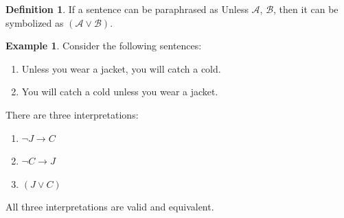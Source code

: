 \documentclass{tufte-handout}
\theoremstyle{definition}
\newtheorem{defn}{Definition}
\theoremstyle{example}
\newtheorem{exmp}{Example}
\theoremstyle{remark}
\begin{document}
\begin{framed}
\begin{defn}
If a sentence can be paraphrased as Unless $\mathcal{A}$, $\mathcal{B}$, then it can be symbolized as $(\mathcal{A} \lor \mathcal{B})$.
\end{defn}
\end{framed}
\begin{exmp}
  Consider the following sentences:
  \begin{enumerate}[leftmargin=3\parindent]
    \item Unless you wear a jacket, you will catch a cold.
    \item You will catch a cold unless you wear a jacket.
  \end{enumerate}
  There are three interpretations:
  \begin{enumerate}[leftmargin=3\parindent]
    \item $\neg J \to C$
    \item $\neg C \to J$
    \item $(J \lor C)$
  \end{enumerate}
  All three interpretations are valid and equivalent.
\end{exmp}
\end{document}

